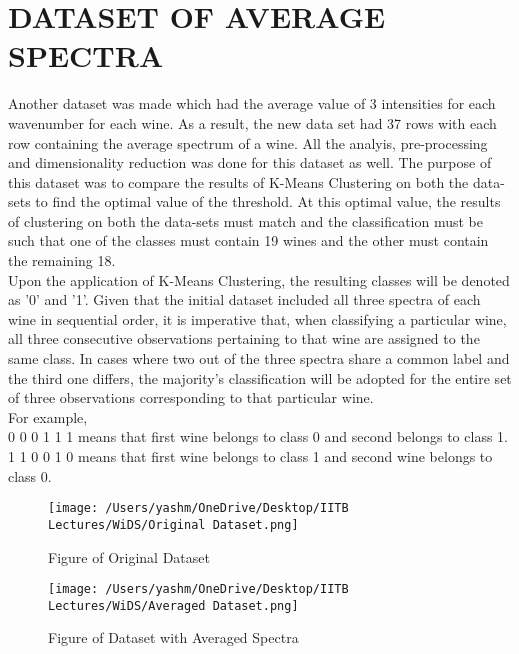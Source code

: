 \documentclass{article}
\begin{document}
\section{DATASET OF AVERAGE SPECTRA}\label{sec:rule}
Another dataset was made which had the average value of 3 intensities for each wavenumber for each wine. As a result, the new data set had 37 rows with each row containing the average spectrum of a wine. All the analyis, pre-processing and dimensionality reduction was done for this dataset as well. The purpose of this dataset was to compare the results of K-Means Clustering on both the data-sets to find the optimal value of the threshold. At this optimal value, the results of clustering on both the data-sets must match and the classification must be such that one of the classes must contain 19 wines and the other must contain the remaining 18.\\
\newline
Upon the application of K-Means Clustering, the resulting classes will be denoted as '0' and '1'. Given that the initial dataset included all three spectra of each wine in sequential order, it is imperative that, when classifying a particular wine, all three consecutive observations pertaining to that wine are assigned to the same class. In cases where two out of the three spectra share a common label and the third one differs, the majority's classification will be adopted for the entire set of three observations corresponding to that particular wine.\\
\newline
For example,\\
0 0 0 1 1 1 means that first wine belongs to class 0 and second belongs to class 1.\\
1 1 0 0 1 0 means that first wine belongs to class 1 and second wine belongs to class 0.\\
\begin{figure}[H]
	\centering 
	\texttt{[image: /Users/yashm/OneDrive/Desktop/IITB Lectures/WiDS/Original Dataset.png]}
	\caption[Optional Caption]{Figure of Original Dataset}
	\label{fig:fig3}
\end{figure}

\begin{figure}[H]
	\centering 
	\texttt{[image: /Users/yashm/OneDrive/Desktop/IITB Lectures/WiDS/Averaged Dataset.png]}
	\caption[Optional Caption]{Figure of Dataset with Averaged Spectra}
	\label{fig:fig4}
\end{figure}
\newpage
\end{document}
